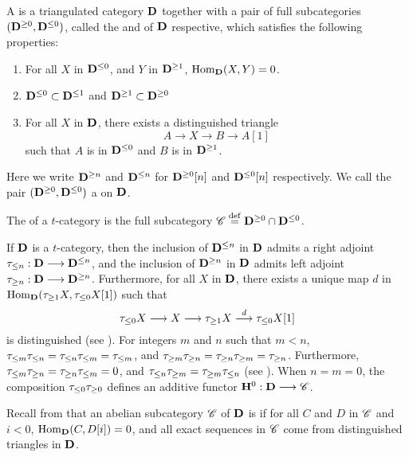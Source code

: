 \begin{defn}\label{def_t_struct}
A  is a triangulated category $\mathbf{D}$ together
with a pair of full subcategories $(\mathbf{D}^{\geq 0}, 
\mathbf{D}^{\leq 0})$, called the  and 
 of $\mathbf{D}$ respective, which satisfies the 
following properties:
\begin{enumerate}
\item For all $X$ in $\mathbf{D}^{\leq 0}$, and $Y$ in $\mathbf{D}^{\geq 1}$, 
$\mathrm{Hom}_{\mathbf{D}}(X, Y) = 0$.

\item $\mathbf{D}^{\leq 0} \subset \mathbf{D}^{\leq 1}$ and
$\mathbf{D}^{\geq 1} \subset \mathbf{D}^{\geq 0}$

\item For all $X$ in $\mathbf{D}$, there exists a distinguished 
triangle
\[
A \to X \to B \to A[1]
\]
such that $A$ is in $\mathbf{D}^{\leq 0}$ and $B$ is in 
$\mathbf{D}^{\geq 1}$.
\end{enumerate}
\noindent Here we write $\mathbf{D}^{\geq n}$ and $\mathbf{D}^{\leq n}$ for 
$\mathbf{D}^{\geq 0}[n]$ and $\mathbf{D}^{\leq 0}[n]$ respectively. We call
the pair $(\mathbf{D}^{\geq 0}, \mathbf{D}^{\leq 0})$ a  
on $\mathbf{D}$.

The  of a $t$-category is the full subcategory
$\mathscr{C} \stackrel{\mathrm{def}}{=} \mathbf{D}^{\geq 0} \cap \mathbf{D}^{\leq 0}$.
\end{defn}

If $\mathbf{D}$ is a $t$-category, then the inclusion of $\mathbf{D}^{\leq 
n}$ in $\mathbf{D}$ admits a right adjoint $\tau_{\leq n}: \mathbf{D} \longrightarrow 
\mathbf{D}^{\leq n}$, and the inclusion of $\mathbf{D}^{\geq n}$ in $\mathbf{D}$ 
admits left adjoint $\tau_{\geq n}: \mathbf{D} \longrightarrow \mathbf{D}^{\geq n}$. 
Furthermore, for all $X$ in $\mathbf{D}$, there exists a unique map $d$ 
in $\mathrm{Hom}_{\mathbf{D}}(\tau_{\geq 1}X, \tau_{\leq 0}X[1])$ such that
\[
\tau_{\leq 0} X \longrightarrow X \longrightarrow \tau_{\geq 1} X \stackrel{d}{\longrightarrow} \tau_{\leq 0}X[1]
\]
is distinguished (see \cite[1.3.3]{BBD}). For integers $m$ and $n$ 
such that $m < n$, $\tau_{\leq m} \tau_{\leq n} = 
\tau_{\leq n}\tau_{\leq m} = \tau_{\leq m}$, and $\tau_{\geq m} 
\tau_{\geq n} = \tau_{\geq n} \tau_{\geq m} = \tau_{\geq n}$. Furthermore, 
$\tau_{\leq m} \tau_{\geq n} = \tau_{\geq n} \tau_{\leq m} = 0$, and
$\tau_{\leq n} \tau_{\geq m} = \tau_{\geq m} \tau_{\leq n}$ 
(see \cite[1.3.5]{BBD}). When $n = m = 0$, the composition
$\tau_{\leq 0} \tau_{\geq 0}$ defines an additive functor 
$\mathbf{H}^0 : \mathbf{D} \longrightarrow \mathscr{C}$.

Recall from \cite[1.2.5]{BBD} that an abelian subcategory 
$\mathscr{C}$ of $\mathbf{D}$ is  if for all $C$ and $D$ in 
$\mathscr{C}$ and $i < 0$, $\mathrm{Hom}_{\mathbf{D}}(C, D[i]) = 0$, and all exact
sequences in $\mathscr{C}$ come from distinguished triangles in 
$\mathbf{D}$.

